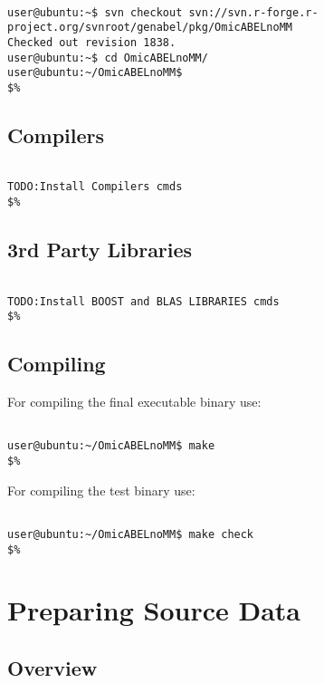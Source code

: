 \documentclass{report}
\begin{document}
\begin{lstlisting}[style=BASH,escapechar=\%]

user@ubuntu:~$ svn checkout svn://svn.r-forge.r-project.org/svnroot/genabel/pkg/OmicABELnoMM
Checked out revision 1838.
user@ubuntu:~$ cd OmicABELnoMM/
user@ubuntu:~/OmicABELnoMM$
$%
\end{lstlisting}

\section{Compilers}

\begin{lstlisting}[style=BASH,escapechar=\%]

TODO:Install Compilers cmds
$%
\end{lstlisting}

\section{3rd Party Libraries}

\begin{lstlisting}[style=BASH,escapechar=\%]

TODO:Install BOOST and BLAS LIBRARIES cmds
$%
\end{lstlisting}

\section{Compiling}

For compiling the final executable binary use:
\begin{lstlisting}[style=BASH,escapechar=\%]

user@ubuntu:~/OmicABELnoMM$ make
$%
\end{lstlisting}

For compiling the test binary use:
\begin{lstlisting}[style=BASH,escapechar=\%]

user@ubuntu:~/OmicABELnoMM$ make check
$%
\end{lstlisting}

\chapter{Preparing Source Data}

\section{Overview}
\end{document}
